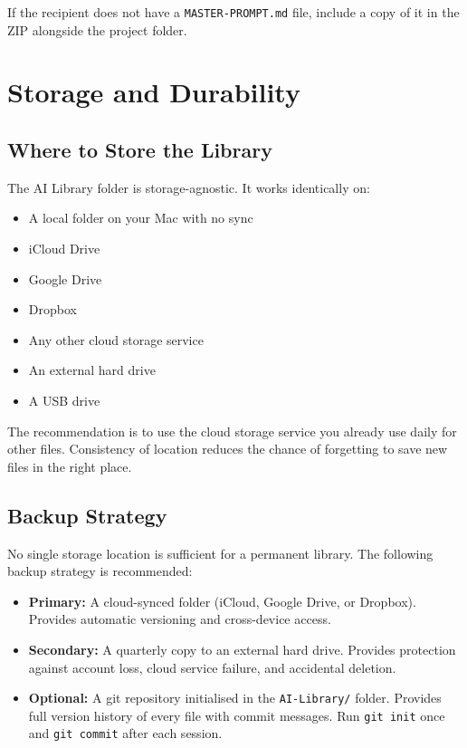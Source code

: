 \documentclass[12pt,letterpaper]{article}
\begin{document}
If the recipient does not have a \texttt{MASTER-PROMPT.md} file, include a
copy of it in the ZIP alongside the project folder.

\section{Storage and Durability}

\subsection{Where to Store the Library}

The AI Library folder is storage-agnostic. It works identically on:

\begin{itemize}
  \item A local folder on your Mac with no sync
  \item iCloud Drive
  \item Google Drive
  \item Dropbox
  \item Any other cloud storage service
  \item An external hard drive
  \item A USB drive
\end{itemize}

The recommendation is to use the cloud storage service you already use
daily for other files. Consistency of location reduces the chance of
forgetting to save new files in the right place.

\subsection{Backup Strategy}

No single storage location is sufficient for a permanent library.
The following backup strategy is recommended:

\begin{itemize}
  \item \textbf{Primary:} A cloud-synced folder (iCloud, Google Drive,
        or Dropbox). Provides automatic versioning and cross-device access.

  \item \textbf{Secondary:} A quarterly copy to an external hard drive.
        Provides protection against account loss, cloud service failure,
        and accidental deletion.

  \item \textbf{Optional:} A git repository initialised in the
        \texttt{AI-Library/} folder. Provides full version history of
        every file with commit messages. Run \texttt{git init} once and
        \texttt{git commit} after each session.
\end{itemize}
\end{document}
